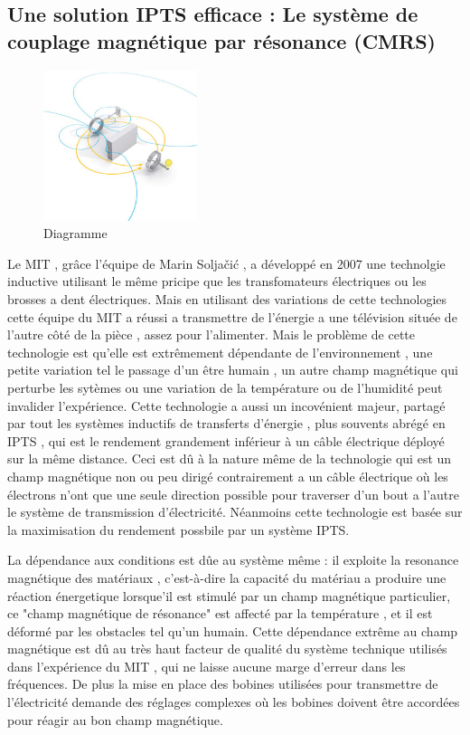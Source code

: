 \documentclass[12pt]{report}
\begin{document}
\subsection{Une solution IPTS efficace : Le système de couplage magnétique par résonance (CMRS) \cite{mSojal}}
\begin{figure}
  \begin{center}
  \includegraphics[width=0.4\textwidth]{WTdiagram}
  \end{center}
\caption{Diagramme}
\end{figure}Le MIT , grâce l'équipe de Marin Soljačić , a développé en 2007 une technolgie inductive utilisant le même pricipe que les transfomateurs électriques ou les brosses a dent électriques. Mais en utilisant des variations de cette technologies cette équipe du MIT a réussi a transmettre de l'énergie a une télévision située de l'autre côté de la pièce , assez pour l'alimenter. Mais le problème de cette technologie est qu'elle est extrêmement dépendante de l'environnement , une petite variation tel le passage d'un être humain , un autre champ magnétique qui perturbe les sytèmes ou une variation de la température ou de l'humidité peut invalider l'expérience. Cette technologie a aussi un incovénient majeur, partagé par tout les systèmes inductifs de transferts d'énergie , plus souvents abrégé en IPTS , qui est le rendement grandement inférieur à un câble électrique déployé sur la même distance. Ceci est dû à la nature même de la technologie qui est un champ magnétique non ou peu dirigé contrairement a un câble électrique où les électrons n'ont que une seule direction possible pour traverser d'un bout a l'autre le système de transmission d'électricité. Néanmoins cette technologie est basée sur la maximisation du rendement possbile par un système IPTS.

	La dépendance aux conditions est dûe au système même : il exploite la resonance magnétique des matériaux , c'est-à-dire la capacité du matériau a produire une réaction énergetique lorsque'il est stimulé par un champ magnétique particulier, ce "champ magnétique de résonance" est affecté par la température , et il est déformé par les obstacles tel qu'un humain. Cette dépendance extrême au champ magnétique est dû au très haut facteur de qualité du système technique utilisés dans l'expérience du MIT , qui ne laisse aucune marge d'erreur dans les fréquences. De plus la mise en place des bobines utilisées pour transmettre de l'électricité demande des réglages complexes où les bobines doivent être accordées pour réagir au bon champ magnétique.
	
\end{document}
